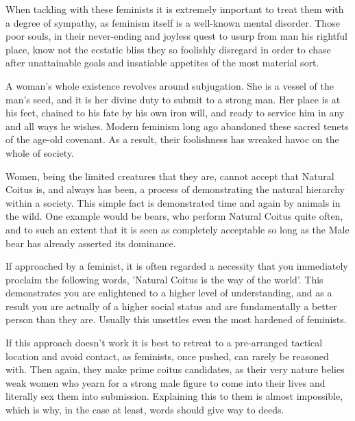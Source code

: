 When tackling with these feminists it is extremely important to treat them with 
a degree of sympathy, as feminism itself is a well-known mental disorder. Those 
poor souls, in their never-ending and joyless quest to usurp from man his 
rightful place, know not the ecstatic bliss they so foolishly disregard in order 
to chase after unattainable goals and insatiable appetites of the most material 
sort.


A woman's whole existence revolves around subjugation. She is a vessel of the 
man's seed, and it is her divine duty to submit to a strong man. Her place is at 
his feet, chained to his fate by his own iron will, and ready to service him in 
any and all ways he wishes. Modern feminism long ago abandoned these sacred 
tenets of the age-old covenant. As a result, their foolishness has wreaked havoc 
on the whole of society.


Women, being the limited creatures that they are, cannot accept that Natural 
Coitus is, and always has been, a process of demonstrating the natural hierarchy 
within a society. This simple fact is demonstrated time and again by animals in 
the wild. One example would be bears, who perform Natural Coitus quite often, 
and to such an extent that it is seen as completely acceptable so long as the 
Male bear has already asserted its dominance.


If approached by a feminist, it is often regarded a necessity that you 
immediately proclaim the following words, 'Natural Coitus is the way of the 
world'. This demonstrates you are enlightened to a higher level of 
understanding, and as a result you are actually of a higher social status and 
are fundamentally a better person than they are. Usually this unsettles even the 
most hardened of feminists.


If this approach doesn't work it is best to retreat to a pre-arranged tactical 
location and avoid contact, as feminists, once pushed, can rarely be reasoned 
with. Then again, they make prime coitus candidates, as their very nature belies 
weak women who yearn for a strong male figure to come into their lives and 
literally sex them into submission. Explaining this to them is almost 
impossible, which is why, in the case at least, words should give way to deeds.